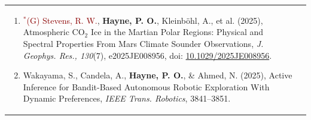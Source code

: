 \documentclass[letterpaper,10pt,twoside]{article}
\begin{document}
\begin{longtable}{@{} p{} p{}}
\begin{enumerate}[leftmargin=!,labelindent=2.5pt,itemindent=-10pt]
{            }
            \item{\small \textcolor{darkred}{$^*$(G) Stevens, R. W.}, \textbf{Hayne, P. O.}, Kleinb{\"o}hl, A., et al. (2025), Atmospheric CO$_2$ Ice in the Martian Polar Regions: Physical and Spectral Properties From Mars Climate Sounder Observations, \textit{J. Geophys. Res., 130}(7), e2025JE008956, doi: \href{https://doi.org/10.1029/2025JE008956}{10.1029/2025JE008956}.
            }
            \item{\small Wakayama, S., Candela, A., \textbf{Hayne, P. O.}, \& Ahmed, N. (2025), Active Inference for Bandit-Based Autonomous Robotic Exploration With Dynamic Preferences, \textit{IEEE Trans. Robotics}, 3841--3851.
            }
        \end{enumerate}\\


\end{longtable}
\end{document}
